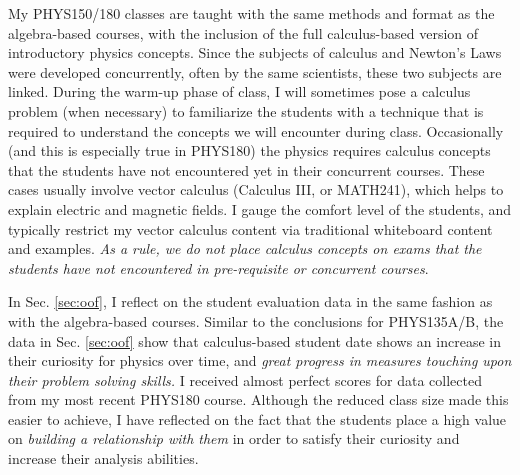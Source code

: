 \documentclass[../../../main.tex]{subfiles}
\begin{document}
My PHYS150/180 classes are taught with the same methods and format as the algebra-based courses, with the inclusion of the full calculus-based version of introductory physics concepts.  Since the subjects of calculus and Newton's Laws were developed concurrently, often by the same scientists, these two subjects are linked.  During the warm-up phase of class, I will sometimes pose a calculus problem (when necessary) to familiarize the students with a technique that is required to understand the concepts we will encounter during class.  Occasionally (and this is especially true in PHYS180) the physics requires calculus concepts that the students have not encountered yet in their concurrent courses.  These cases usually involve vector calculus (Calculus III, or MATH241), which helps to explain electric and magnetic fields.  I gauge the comfort level of the students, and typically restrict my vector calculus content via traditional whiteboard content and examples.  \textit{As a rule, we do not place calculus concepts on exams that the students have not encountered in pre-requisite or concurrent courses}.  \\ \hspace{0.1cm}

In Sec. \ref{sec:oof}, I reflect on the student evaluation data in the same fashion as with the algebra-based courses.  Similar to the conclusions for PHYS135A/B, the data in Sec. \ref{sec:oof} show that calculus-based student date shows an increase in their curiosity for physics over time, and \textit{great progress in measures touching upon their problem solving skills.}  I received almost perfect scores for data collected from my most recent PHYS180 course.  Although the reduced class size made this easier to achieve, I have reflected on the fact that the students place a high value on \textit{building a relationship with them} in order to satisfy their curiosity and increase their analysis abilities. %

\end{document}
